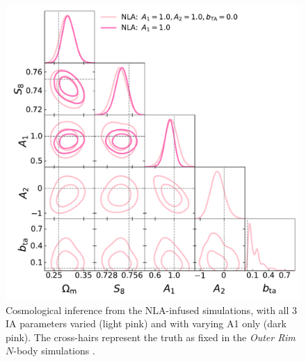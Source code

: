 \begin{figure}
\includegraphics[width=\columnwidth]{graphs/NLA_1_0_0.pdf}
\caption{Cosmological inference from the NLA-infused simulations, with all 3 IA parameters varied (light pink) and with varying A1 only (dark pink).
The cross-hairs represent the truth as fixed in the {\it Outer Rim} $N$-body simulations \citep{OuterRim}.}
\label{fig:corner_nla_all_ia_params}
\end{figure}